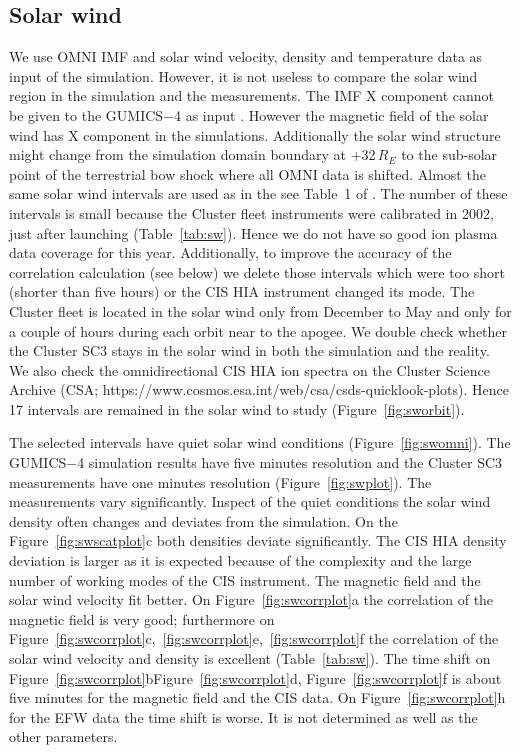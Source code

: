 \documentclass[linenumbers,draft]{agujournal}
\begin{document}
\subsection{Solar wind}
\label{sec:sw}

We use OMNI IMF and solar wind velocity, density and temperature data as input of the simulation. However, it is not useless to compare the solar wind region in the simulation and the measurements. The IMF X component cannot be given to the GUMICS$-$4 as input \citep{janhunen12:_gumic_mhd,facsko16:_one_earth}. However the magnetic field of the solar wind has X component in the simulations. Additionally the solar wind structure might change from the simulation domain boundary at +32\,$R_E$ to the sub-solar point of the terrestrial bow shock where all OMNI data is shifted. Almost the same solar wind intervals are used as in the see Table~1 of \citet{facsko16:_one_earth}. The number of these intervals is small because the Cluster fleet instruments were calibrated in 2002, just after launching (Table~\ref{tab:sw}). Hence we do not have so good ion plasma data coverage for this year. Additionally, to improve the accuracy of the correlation calculation (see below) we delete those intervals which were too short (shorter than five hours) or the CIS HIA instrument changed its mode. The Cluster fleet is located in the solar wind only from December to May and only for a couple of hours during each orbit near to the apogee. We double check whether the Cluster SC3 stays in the solar wind in both the simulation and the reality. We also check the omnidirectional CIS HIA ion spectra on the Cluster Science Archive (CSA; https://www.cosmos.esa.int/web/csa/csds-quicklook-plots). Hence 17 intervals are remained in the solar wind to study (Figure~\ref{fig:sworbit}). 

The selected intervals have quiet solar wind conditions (Figure~\ref{fig:swomni}). The GUMICS$-$4 simulation results have five minutes resolution and the Cluster SC3 measurements have one minutes resolution (Figure~\ref{fig:swplot}). The measurements vary significantly. Inspect of the quiet conditions the solar wind density often changes and deviates from the simulation. On the Figure~\ref{fig:swscatplot}c both densities deviate significantly. The CIS HIA density deviation is larger as it is expected because of the complexity and the large number of working modes of the CIS instrument. The magnetic field and the solar wind velocity fit better. On Figure~\ref{fig:swcorrplot}a the correlation of the magnetic field is very good; furthermore on Figure~\ref{fig:swcorrplot}c,~\ref{fig:swcorrplot}e,~\ref{fig:swcorrplot}f the correlation of the solar wind velocity and density is excellent (Table~\ref{tab:sw}). The time shift on Figure~\ref{fig:swcorrplot}bFigure~\ref{fig:swcorrplot}d, Figure~\ref{fig:swcorrplot}f is about five minutes for the magnetic field and the CIS data. On Figure~\ref{fig:swcorrplot}h for the EFW data the time shift is worse. It is not determined as well as the other parameters.
\end{document}

